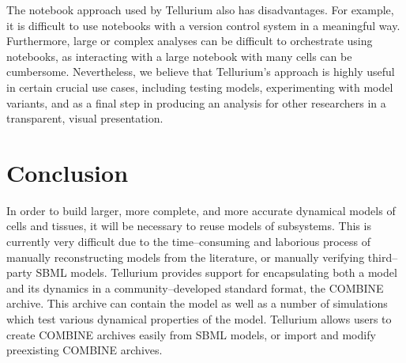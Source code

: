 \documentclass[10pt,letterpaper]{article}
\begin{document}
The notebook approach used by Tellurium also has disadvantages. For example, it is difficult to use notebooks with a version control system in a meaningful way. Furthermore, large or complex analyses can be difficult to orchestrate using notebooks, as interacting with a large notebook with many cells can be cumbersome. %
Nevertheless, we believe that Tellurium's approach is highly useful in certain crucial use cases, including testing models, experimenting with model variants, and as a final step in producing an analysis for other researchers in a transparent, visual presentation.


\section*{Conclusion}

In order to build larger, more complete, and more accurate dynamical models of cells and tissues, it will be necessary to reuse models of subsystems. This is currently very difficult due to the time--consuming and laborious process of manually reconstructing models from the literature, or manually verifying third--party SBML models. Tellurium provides support for encapsulating both a model and its dynamics in a community--developed standard format, the COMBINE archive. This archive can contain the model as well as a number of simulations which test various dynamical properties of the model. Tellurium allows users to create COMBINE archives easily from SBML models, or import and modify preexisting COMBINE archives.
\end{document}
